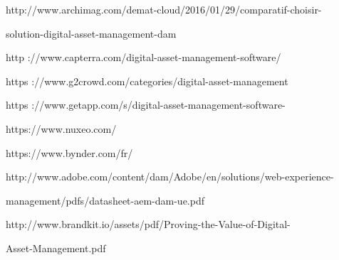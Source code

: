 http://www.archimag.com/demat-cloud/2016/01/29/comparatif-choisir-

solution-digital-asset-management-dam
\newline

http ://www.capterra.com/digital-asset-management-software/
\newline

https ://www.g2crowd.com/categories/digital-asset-management
\newline

https ://www.getapp.com/s/digital-asset-management-software-
\newline

https://www.nuxeo.com/
\newline

https://www.bynder.com/fr/
\newline

http://www.adobe.com/content/dam/Adobe/en/solutions/web-experience-

management/pdfs/datasheet-aem-dam-ue.pdf
\newline

http://www.brandkit.io/assets/pdf/Proving-the-Value-of-Digital-

Asset-Management.pdf
\newline



